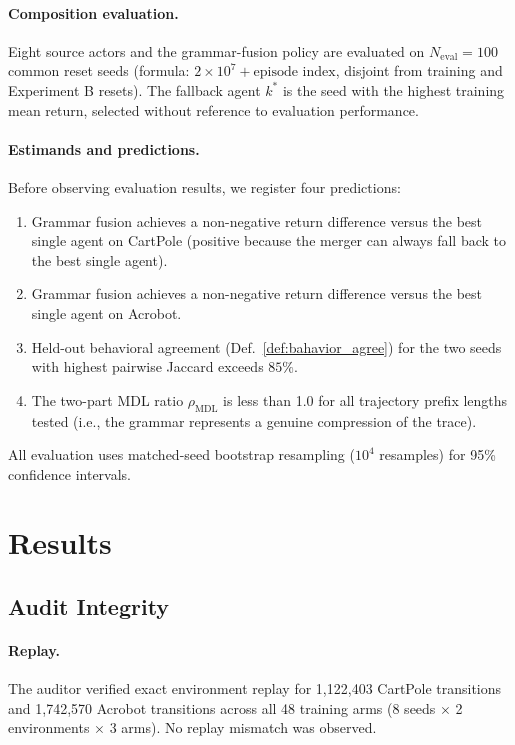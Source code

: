\documentclass[12pt]{article}
\begin{document}
\paragraph{Composition evaluation.}
Eight source actors and the grammar-fusion policy are evaluated on $N_{\mathrm{eval}} = 100$
common reset seeds
(formula: $2 \times 10^7 + \text{episode index}$, disjoint from training
and Experiment B resets).
The fallback agent $k^*$ is the seed with the highest training mean return,
selected without reference to evaluation performance.

\paragraph{Estimands and predictions.}
Before observing evaluation results, we register four predictions:
\begin{enumerate}
\item[P1] Grammar fusion achieves a non-negative return difference versus
  the best single agent on CartPole (positive because the merger can always
  fall back to the best single agent).
\item[P2] Grammar fusion achieves a non-negative return difference versus
  the best single agent on Acrobot.
\item[P3] Held-out behavioral agreement (Def.~\ref{def:bahavior_agree})
  for the two seeds with highest pairwise Jaccard exceeds $85\%$.
\item[P4] The two-part MDL ratio $\rho_{\mathrm{MDL}}$ is less than 1.0
  for all trajectory prefix lengths tested (i.e., the grammar represents
  a genuine compression of the trace).
\end{enumerate}
All evaluation uses matched-seed bootstrap resampling
($10^4$ resamples) for 95\% confidence intervals.

\section{Results}
\label{sec:results}

\subsection{Audit Integrity}
\label{sec:results:audit}

\paragraph{Replay.}
The auditor verified exact environment replay for
1{,}122{,}403 CartPole transitions and 1{,}742{,}570 Acrobot transitions
across all 48 training arms (8 seeds $\times$ 2 environments $\times$ 3 arms).
No replay mismatch was observed.
\end{document}
